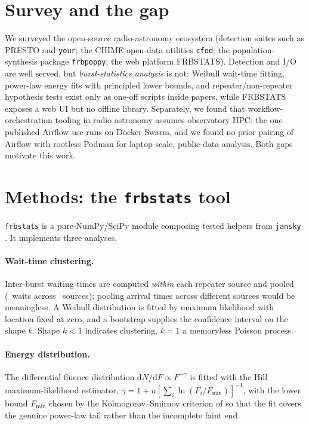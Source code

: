 \documentclass[twocolumn]{aastex631}
\newcommand{\code}[1]{\texttt{#1}}
\begin{document}
\section{Survey and the gap}
We surveyed the open-source radio-astronomy ecosystem (detection suites such as PRESTO and
\code{your}; the CHIME open-data utilities \code{cfod}; the population-synthesis package
\code{frbpoppy}; the web platform FRBSTATS). Detection and I/O are well served, but
\emph{burst-statistics analysis} is not: Weibull wait-time fitting, power-law energy fits
with principled lower bounds, and repeater/non-repeater hypothesis tests exist only as
one-off scripts inside papers, while FRBSTATS exposes a web UI but no offline library.
Separately, we found that workflow-orchestration tooling in radio astronomy assumes
observatory HPC: the one published Airflow use \citep[CHIME/FRB baseband;][]{chime25repeaters}
runs on Docker Swarm, and we found no prior pairing of Airflow with rootless Podman for
laptop-scale, public-data analysis. Both gaps motivate this work.

\section{Methods: the \code{frbstats} tool}
\code{frbstats} is a pure-NumPy/SciPy module composing tested helpers from \code{jansky}
\citep{jansky}. It implements three analyses.

\paragraph{Wait-time clustering.} Inter-burst waiting times are computed \emph{within} each
repeater source and pooled (\weibullNwaits\ waits across \nRepeaterSources\ sources);
pooling arrival times across different sources would be meaningless. A Weibull distribution
is fitted by maximum likelihood with location fixed at zero, and a bootstrap supplies the
confidence interval on the shape $k$. Shape $k<1$ indicates clustering, $k=1$ a memoryless
Poisson process.

\paragraph{Energy distribution.} The differential fluence distribution
$\mathrm{d}N/\mathrm{d}F\propto F^{-\gamma}$ is fitted with the Hill maximum-likelihood
estimator, $\gamma = 1 + n\left[\sum_i \ln(F_i/F_\mathrm{min})\right]^{-1}$, with the
lower bound $F_\mathrm{min}$ chosen by the Kolmogorov--Smirnov criterion of
\citet{clauset2009} so that the fit covers the genuine power-law tail rather than the
incomplete faint end.
\end{document}
